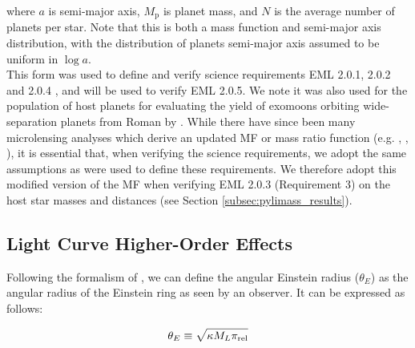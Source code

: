 \documentclass[twocolumn]{aastex631}
\newcommand{\mpl}{M_{\mathrm{p}}}      %
\begin{document}
\noindent where $a$ is semi-major axis, $\mpl$ is planet mass, and $N$ is the average number of planets per star. 
Note that this is both a mass function and semi-major axis distribution, with the distribution of planets semi-major axis assumed to be uniform in $\log a$.\\
\indent This form was used to define and verify science requirements EML 2.0.1, 2.0.2 \citep{penny19} and 2.0.4 \citep{johnson:2020a}, and will be used to verify EML 2.0.5. We note it was also used for the population of host planets for evaluating the yield of exomoons orbiting wide-separation planets from Roman by \cite{lastovka:2025a}. While there have since been many microlensing analyses which derive an updated MF or mass ratio function (e.g. \cite{suzuki:2016a, suzuki:2018a}, \cite{bennett:2021a}, \cite{zang:2025a}), it is essential that, when verifying the science requirements, we adopt the same assumptions as were used to define these requirements.  We therefore adopt this modified version of the \cite{cassan:2012a} MF when verifying EML 2.0.3 (Requirement 3) on the host star masses and distances (see Section \ref{subsec:pylimass_results}).

\subsection{Light Curve Higher-Order Effects} \label{subsec:high-order-effects}

Following the formalism of \cite{gould:2000b}, we can define the angular Einstein radius ($\theta_E$) as the angular radius of the Einstein ring as seen by an observer. It can be expressed as follows:

\begin{equation}
    \theta_E \equiv \sqrt{\kappa M_L \pi_{\rm rel}}
\end{equation}
\end{document}
